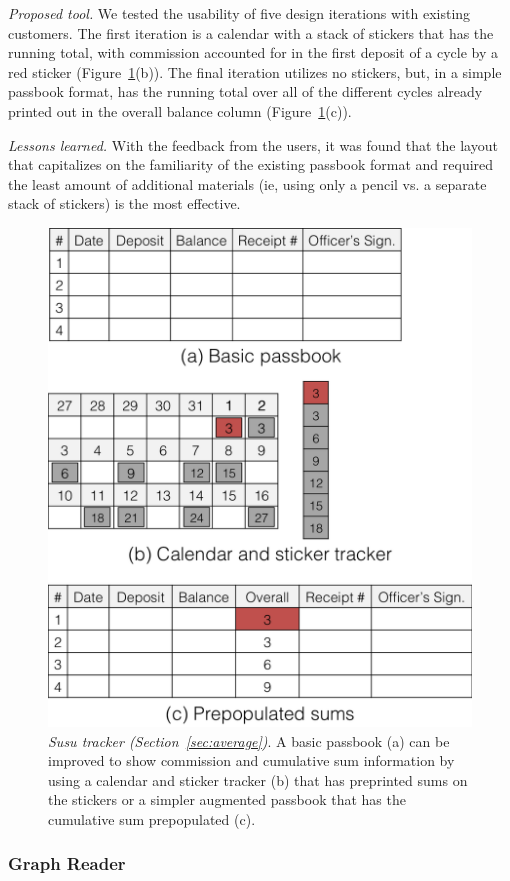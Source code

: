 \documentclass{sig-alternate}
\begin{document}
\emph{Proposed tool.}
We tested the usability of five design iterations with existing customers. 
The first iteration is a calendar with a stack of stickers that has the running total, with commission accounted for in the first deposit of a cycle by a red sticker (Figure~\ref{fig:susu}(b)). The final iteration utilizes no stickers, but, in a simple passbook format, has the running total over all of the different cycles already printed out in the overall balance column (Figure~\ref{fig:susu}(c)). 

\emph{Lessons learned.}
With the feedback from the users, it was found that the layout that capitalizes on the familiarity of the existing passbook format and required the least amount of additional materials (ie, using only a pencil vs. a separate stack of stickers) is the most effective.


\begin{figure}
\centering
\includegraphics[width=.75\linewidth]{img/susu.png}
\caption{\emph{Susu tracker (Section~\ref{sec:average})}. A basic passbook (a) can be improved to show commission and cumulative sum information by using a calendar and sticker tracker (b) that has preprinted sums on the stickers or a simpler augmented passbook that has the cumulative sum prepopulated (c).}
\label{fig:susu}
\end{figure}

\subsubsection{Graph Reader}
\label{sec:graph}
\end{document}
